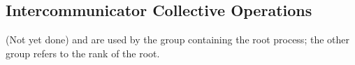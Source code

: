 \documentclass{article}
\begin{document}
\subsection{Intercommunicator Collective Operations}
(Not yet done)
 and  are used by the group
containing the root process; the other group refers to the rank of the root.
\end{document}
